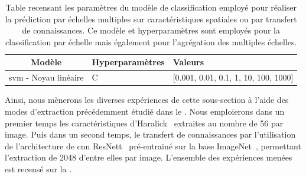 \begin{table}[H]
    \centering
    \begin{tabular}{cll}
        \toprule
        \textbf{Modèle}                                 & \textbf{Hyperparamètres}  & \textbf{Valeurs}                          \\ \midrule
        \gls{svm} - Noyau linéaire                      & C                         & [0.001, 0.01, 0.1, 1, 10, 100, 1000]      \\ 
        \bottomrule 
    \end{tabular} 
    \caption{Table recensant les paramètres du modèle de classification employé pour réaliser la prédiction par échelles multiples sur caractéristiques spatiales ou par transfert de connaissances. Ce modèle et hyperparamètres sont employés pour la classification par échelle mais également pour l'agrégation des multiples échelles.}
    \label{tab:image_improvement_models_multiscale_spatial}
\end{table}\par

Ainsi, nous mènerons les diverses expériences de cette sous-section à l'aide des modes d'extraction précédemment étudié dans le . Nous emploierons dans un premier temps les caractéristiques d'Haralick~\cite{Haralick1973} extraites au nombre de 56 par image. Puis dans un second temps, le transfert de connaissances par l'utilisation de l'architecture de \gls{cnn} ResNett~\cite{He2016} pré-entrainé sur la base ImageNet~\cite{Canziani2016}, permettant l'extraction de 2048 d'entre elles par image. L'ensemble des expériences menées est recensé sur la .\par

